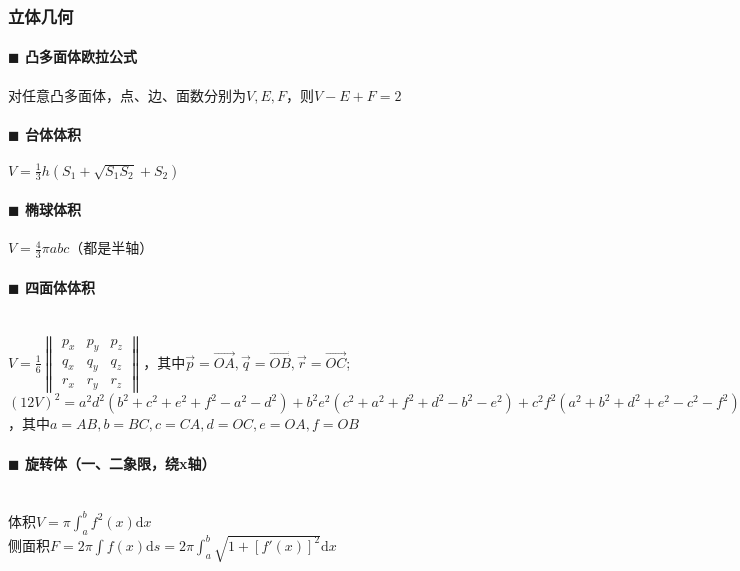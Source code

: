 \subsubsection{立体几何}
\paragraph{$\blacksquare$ 凸多面体欧拉公式}
对任意凸多面体，点、边、面数分别为$V, E, F$，则$V-E+F=2$
\paragraph{$\blacksquare$ 台体体积}
$V=\frac{1}{3}h(S_1+\sqrt {S_1S_2}+S_2)$
\paragraph{$\blacksquare$ 椭球体积}
$V=\frac{4}{3} \pi abc$（都是半轴）
\paragraph{$\blacksquare$ 四面体体积}
\noindent \\
$V=\frac{1}{6} \begin{Vmatrix} p_x & p_y & p_z\\ q_x & q_y & q_z\\ r_x & r_y & r_z \end{Vmatrix}$，其中$\vec p=\overrightarrow{OA}, \vec q=\overrightarrow{OB}, \vec r=\overrightarrow{OC}$;\\
$(12V)^2=a^2d^2(b^2+c^2+e^2+f^2-a^2-d^2)+b^2e^2(c^2+a^2+f^2+d^2-b^2-e^2)+c^2f^2(a^2+b^2+d^2+e^2-c^2-f^2)-a^2b^2c^2-a^2e^2f^2-d^2b^2f^2-d^2e^2c^2$，其中$a=AB,b=BC,c=CA,d=OC,e=OA,f=OB$
\paragraph{$\blacksquare$ 旋转体（一、二象限，绕x轴）}
\noindent \\
体积$V=\pi \int_{a}^{b} f^2(x) \mathrm{d} x$\\
侧面积$F=2\pi \int f(x) \mathrm{d} s=2\pi \int_{a}^{b} \sqrt{1+[f'(x)]^2} \mathrm{d} x$\\
